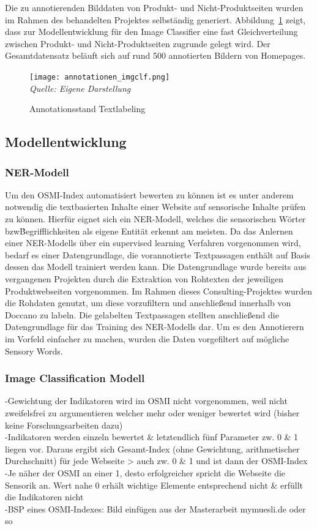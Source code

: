 Die zu annotierenden Bilddaten von Produkt- und Nicht-Produktseiten wurden im Rahmen des behandelten Projektes selbständig
generiert.
Abbildung~\ref{fig:annotation_imgclf} zeigt, dass zur Modellentwicklung für den Image Classifier eine fast Gleichverteilung zwischen Produkt-
und Nicht-Produktseiten zugrunde gelegt wird.
Der Gesamtdatensatz beläuft sich auf rund 500 annotierten Bildern von Homepages.
\begin{figure}[H]
	\caption{Annotationsstand Textlabeling}\label{fig:annotation_imgclf}
	\texttt{[image: annotationen\_imgclf.png]}
	\\
	\textit{Quelle: Eigene Darstellung}
\end{figure}


\subsection{Modellentwicklung}

\subsubsection{NER-Modell}
Um den \ac{OSMI}-Index automatisiert bewerten zu können ist es unter anderem notwendig die textbasierten Inhalte einer
Website auf sensorische Inhalte prüfen zu können.
Hierfür eignet sich ein \ac{NER}-Modell, welches die sensorischen Wörter bzw\. Begrifflichkeiten als eigene Entität erkennt
am meisten.
Da das Anlernen einer NER-Modells über ein supervised learning Verfahren vorgenommen wird, bedarf es einer Datengrundlage,
die vorannotierte Textpassagen enthält auf Basis dessen das Modell trainiert werden kann.
Die Datengrundlage wurde bereits aus vergangenen Projekten durch die Extraktion von Rohtexten der jeweiligen Produktwebseiten
vorgenommen.
Im Rahmen dieses Consulting-Projektes wurden die Rohdaten genutzt, um diese vorzufiltern und anschließend innerhalb von
Doccano zu labeln.
Die gelabelten Textpassagen stellten anschließend die Datengrundlage für das Training des \ac{NER}-Modells dar.
Um es den Annotierern im Vorfeld einfacher zu machen, wurden die Daten vorgefiltert auf mögliche Sensory Words.

\subsubsection{Image Classification Modell}

-Gewichtung der Indikatoren wird im \ac{OSMI} nicht vorgenommen, weil nicht zweifelsfrei zu
argumentieren welcher mehr oder weniger bewertet wird (bisher keine Forschungsarbeiten
dazu) \\
-Indikatoren werden einzeln bewertet \& letztendlich fünf Parameter zw. 0 \& 1 liegen vor.
Daraus ergibt sich Gesamt-Index (ohne Gewichtung, arithmetischer Durchschnitt) für jede
Webseite > auch zw. 0 \& 1 und ist dann der \ac{OSMI}-Index \\
-Je näher der \ac{OSMI} an einer 1, desto erfolgreicher spricht die Webseite die Sensorik an. Wert
nahe 0 erhält wichtige Elemente entsprechend nicht \& erfüllt die Indikatoren nicht \\
-BSP eines \ac{OSMI}-Indexes: Bild einfügen aus der Masterarbeit mymuesli.de oder so




